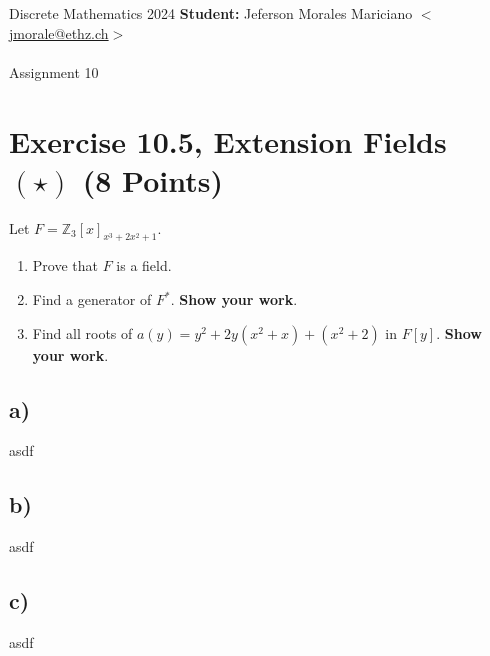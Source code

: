 \documentclass[unicode,11pt,a4paper,oneside,numbers=endperiod,openany]{scrartcl}
\def\Z{\mathbb{Z}}
\begin{document}
\setassignment
{}

\serieheader
{Discrete Mathematics}
{2024}
{%
\textbf{Student:} Jeferson Morales Mariciano 
\href{mailto:jmorale@ethz.ch}{\(<\)jmorale@ethz.ch\(>\)} \\\\}
{\vspace{-1cm}}%
{Assignment 10}{}

\section*{Exercise 10.5, Extension Fields \( (\star) \) \hfill (8 Points)}
Let \( F = \Z_3[x]_{x^3 + 2x^2 + 1} \).

\begin{enumerate}[label=\textbf{\alph*)}]
    \item 
    Prove that \( F \) is a field.

    \item 
    Find a generator of \( F^* \). \textbf{Show your work}.

    \item 
    Find all roots of \( a(y) = y^2 + 2y(x^2 + x) + (x^2 + 2) \) in \( F[y] \).
    \textbf{Show your work}.
\end{enumerate}

\subsection*{a)}
asdf

\subsection*{b)}
asdf


\subsection*{c)}
asdf
\end{document}
